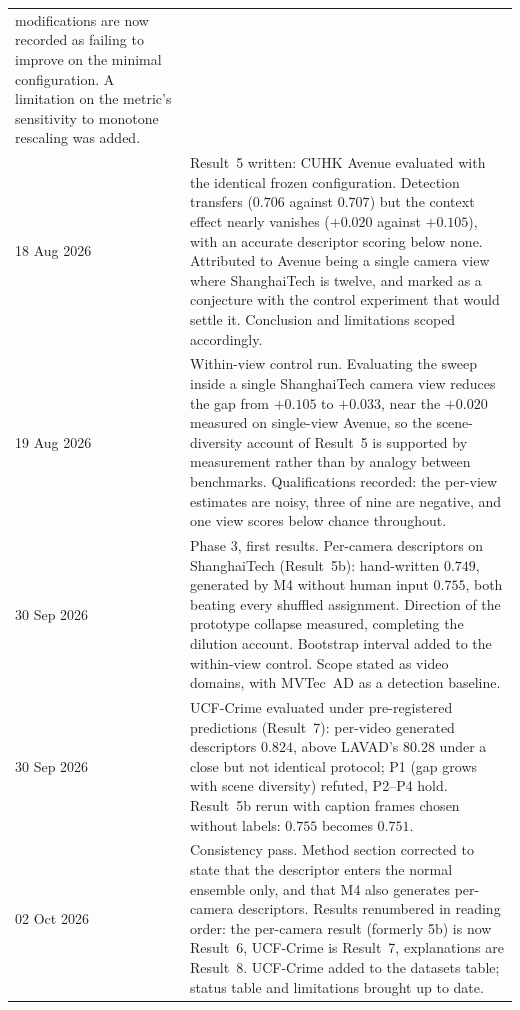 \documentclass[a4paper,fleqn]{cas-sc}
\begin{document}
\begin{table}[width=\linewidth,cols=2,pos=h]
\begin{tabularx}{\linewidth}{@{}l Z@{}}
         modifications are now recorded as failing to improve on the minimal
         configuration. A limitation on the metric's sensitivity to monotone
         rescaling was added. \\
18 Aug 2026 & Result~5 written: CUHK Avenue evaluated with the identical frozen
         configuration. Detection transfers ($0.706$ against $0.707$) but the
         context effect nearly vanishes ($+0.020$ against $+0.105$), with an
         accurate descriptor scoring below none. Attributed to Avenue being a
         single camera view where ShanghaiTech is twelve, and marked as a
         conjecture with the control experiment that would settle it. Conclusion
         and limitations scoped accordingly. \\
19 Aug 2026 & Within-view control run. Evaluating the sweep inside a single
         ShanghaiTech camera view reduces the gap from $+0.105$ to $+0.033$,
         near the $+0.020$ measured on single-view Avenue, so the scene-diversity
         account of Result~5 is supported by measurement rather than by analogy
         between benchmarks. Qualifications recorded: the per-view estimates are
         noisy, three of nine are negative, and one view scores below chance
         throughout. \\
30 Sep 2026 & Phase 3, first results. Per-camera descriptors on ShanghaiTech
         (Result~5b): hand-written $0.749$, generated by M4 without human input
         $0.755$, both beating every shuffled assignment. Direction of the
         prototype collapse measured, completing the dilution account.
         Bootstrap interval added to the within-view control. Scope stated as
         video domains, with MVTec~AD as a detection baseline. \\
30 Sep 2026 & UCF-Crime evaluated under pre-registered predictions
         (Result~7): per-video generated descriptors $0.824$, above LAVAD's
         $80.28$ under a close but not identical protocol; P1 (gap grows with
         scene diversity) refuted, P2--P4 hold. Result~5b rerun with caption
         frames chosen without labels: $0.755$ becomes $0.751$. \\
02 Oct 2026 & Consistency pass. Method section corrected to state that the
         descriptor enters the normal ensemble only, and that M4 also generates
         per-camera descriptors. Results renumbered in reading order: the
         per-camera result (formerly 5b) is now Result~6, UCF-Crime is
         Result~7, explanations are Result~8. UCF-Crime added to the datasets
         table; status table and limitations brought up to date. \\

\end{tabularx}
\end{table}
\end{document}
